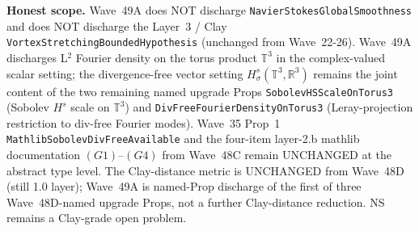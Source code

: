 \begin{remark}
\textbf{Honest scope.} Wave~49A does NOT discharge \texttt{NavierStokesGlobalSmoothness} and does NOT discharge the Layer~3 / Clay \texttt{VortexStretchingBoundedHypothesis} (unchanged from Wave~22-26). Wave~49A discharges L$^2$ Fourier density on the torus product $\mathbb{T}^3$ in the complex-valued scalar setting; the divergence-free vector setting $H^s_\sigma(\mathbb{T}^3, \mathbb{R}^3)$ remains the joint content of the two remaining named upgrade Props \texttt{SobolevHSScaleOnTorus3} (Sobolev $H^s$ scale on $\mathbb{T}^3$) and \texttt{DivFreeFourierDensityOnTorus3} (Leray-projection restriction to div-free Fourier modes). Wave~35 Prop~1 \texttt{MathlibSobolevDivFreeAvailable} and the four-item layer-2.b mathlib documentation $(G1)$--$(G4)$ from Wave~48C remain UNCHANGED at the abstract type level. The Clay-distance metric is UNCHANGED from Wave~48D (still 1.0 layer); Wave~49A is named-Prop discharge of the first of three Wave~48D-named upgrade Props, not a further Clay-distance reduction. NS remains a Clay-grade open problem.
\end{remark}

